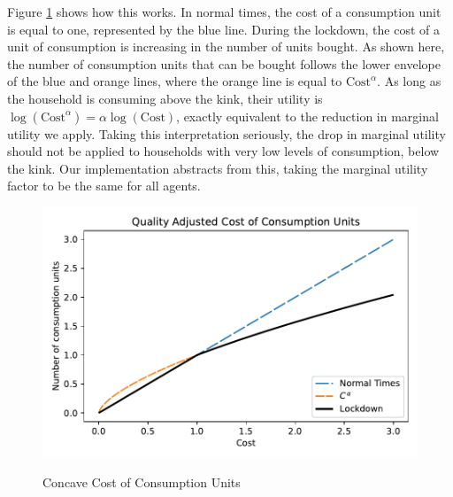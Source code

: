 \documentclass[./ConsumptionResponse]{subfiles}
\begin{document}
Figure \ref{concave_cons} shows how this works.
In normal times, the cost of a consumption unit is equal to one, represented by the blue line.
During the lockdown, the cost of a unit of consumption is increasing in the number of units bought.
As shown here, the number of consumption units that can be bought follows the lower envelope of the blue and orange lines, where the orange line is equal to $\text{Cost}^\alpha$.
As long as the household is consuming above the kink, their utility is $\log (\text{Cost}^\alpha) = \alpha \log (\text{Cost})$, exactly equivalent to the reduction in marginal utility we apply. Taking this interpretation seriously, the drop in marginal utility should not be applied to households with very low levels of consumption, below the kink.
Our implementation abstracts from this, taking the marginal utility factor to be the same for all agents.
\begin{figure}
  \centering
  \caption{Concave Cost of Consumption Units}
  \label{concave_cons}
  { \includegraphics[width=8in]{./Figures/QualityCost}}
\end{figure}
\end{document}
